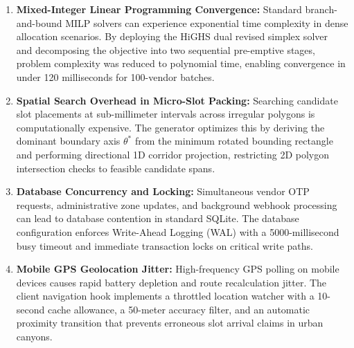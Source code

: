 \begin{enumerate}
    \item \textbf{Mixed-Integer Linear Programming Convergence:} Standard branch-and-bound MILP solvers can experience exponential time complexity in dense allocation scenarios. By deploying the HiGHS dual revised simplex solver~\cite{huang2023highs} and decomposing the objective into two sequential pre-emptive stages, problem complexity was reduced to polynomial time, enabling convergence in under 120 milliseconds for 100-vendor batches.
    \item \textbf{Spatial Search Overhead in Micro-Slot Packing:} Searching candidate slot placements at sub-millimeter intervals across irregular polygons is computationally expensive. The generator optimizes this by deriving the dominant boundary axis $\theta^*$ from the minimum rotated bounding rectangle and performing directional 1D corridor projection, restricting 2D polygon intersection checks to feasible candidate spans.
    \item \textbf{Database Concurrency and Locking:} Simultaneous vendor OTP requests, administrative zone updates, and background webhook processing can lead to database contention in standard SQLite. The database configuration enforces Write-Ahead Logging (WAL) with a 5000-millisecond busy timeout and immediate transaction locks on critical write paths.
    \item \textbf{Mobile GPS Geolocation Jitter:} High-frequency GPS polling on mobile devices causes rapid battery depletion and route recalculation jitter. The client navigation hook implements a throttled location watcher with a 10-second cache allowance, a 50-meter accuracy filter, and an automatic proximity transition that prevents erroneous slot arrival claims in urban canyons.
\end{enumerate}
